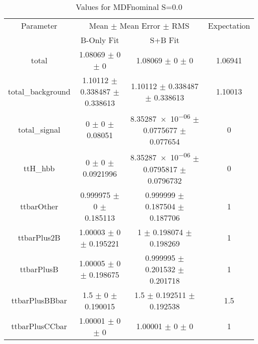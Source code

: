 \begin{table}
\centering
\caption{Values for MDFnominal S=0.0}
\begin{tabular}{cccc}
\toprule
Parameter & \multicolumn{2}{c}{Mean $\pm$ Mean Error $\pm$ RMS} & Expectation\\
 & B-Only Fit & S+B Fit & \\
\midrule
total & \num{1.08069} $\pm$ \num{0} $\pm$ \num{0} & \num{1.08069} $\pm$ \num{0} $\pm$ \num{0} & \num{1.06941}\\
total\_background & \num{1.10112} $\pm$ \num{0.338487} $\pm$ \num{0.338613} & \num{1.10112} $\pm$ \num{0.338487} $\pm$ \num{0.338613} & \num{1.10013}\\
total\_signal & \num{0} $\pm$ \num{0} $\pm$ \num{0.08051} & \num{8.35287e-06} $\pm$ \num{0.0775677} $\pm$ \num{0.077654} & \num{0}\\
ttH\_hbb & \num{0} $\pm$ \num{0} $\pm$ \num{0.0921996} & \num{8.35287e-06} $\pm$ \num{0.0795817} $\pm$ \num{0.0796732} & \num{0}\\
ttbarOther & \num{0.999975} $\pm$ \num{0} $\pm$ \num{0.185113} & \num{0.999999} $\pm$ \num{0.187504} $\pm$ \num{0.187706} & \num{1}\\
ttbarPlus2B & \num{1.00003} $\pm$ \num{0} $\pm$ \num{0.195221} & \num{1} $\pm$ \num{0.198074} $\pm$ \num{0.198269} & \num{1}\\
ttbarPlusB & \num{1.00005} $\pm$ \num{0} $\pm$ \num{0.198675} & \num{0.999995} $\pm$ \num{0.201532} $\pm$ \num{0.201718} & \num{1}\\
ttbarPlusBBbar & \num{1.5} $\pm$ \num{0} $\pm$ \num{0.190015} & \num{1.5} $\pm$ \num{0.192511} $\pm$ \num{0.192538} & \num{1.5}\\
ttbarPlusCCbar & \num{1.00001} $\pm$ \num{0} $\pm$ \num{0} & \num{1.00001} $\pm$ \num{0} $\pm$ \num{0} & \num{1}\\
\bottomrule
\end{tabular}
\end{table}